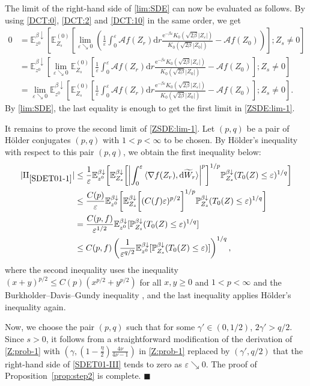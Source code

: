 \documentclass[12pt, twoside]{article}
\numberwithin{figure}{section}
\newcommand{\e}{{\mathrm e}}
\newcommand{\1}{\mathds 1}
\newcommand{\vep}{{\varepsilon}}
\newcommand{\da}{{\downarrow}}
\newcommand{\la}{{\langle}}
\newcommand{\ra}{{\rangle}}
\newcommand{\ms}{\mathscr}
\renewcommand{\P}{{\mathbb P}}
\newcommand{\E}{{\mathbb E}}
\renewcommand{\d}{{\mathrm d}}
\newcommand{\2}{{\mathbf 1}}
\renewenvironment{proof}[1][\proofname]{\noindent {\bfseries #1.}\;}{\hfill\ensuremath{\blacksquare}\\}
\newcommand{\II}{{\rm II}}
\begin{document}
\begin{proof}[Proof of Proposition~\ref{prop:step2}]
The limit of the right-hand side of \eqref{lim:SDE} can now be evaluated as follows. By using  \eqref{DCT:0}, \eqref{DCT:2} and \eqref{DCT:10}  in the same order, we get
\begin{align*}
0&=\E_{z^0}^{\beta\da}\left[\E^{(0)}_{Z_s}\left[\lim_{\vep \searrow 0}\left(\frac{1}{\vep}\int_0^\vep \ms A f(Z_r)\d r\frac{\e^{-\beta\vep}K_0(\sqrt{2\beta}|Z_\vep|)}{K_0(\sqrt{2\beta}|Z_0|)}-\ms Af(Z_0)\right)\right];Z_s\neq 0\right]\\
&=\E_{z^0}^{\beta\da}\left[\lim_{\vep \searrow 0}\E^{(0)}_{Z_s}\left[\frac{1}{\vep}\int_0^\vep \ms A f(Z_r)\d r\frac{\e^{-\beta\vep}K_0(\sqrt{2\beta}|Z_\vep|)}{K_0(\sqrt{2\beta}|Z_0|)}-\ms Af(Z_0)\right];Z_s\neq 0\right]\\
&=\lim_{\vep \searrow 0}\E_{z^0}^{\beta\da}\left[\E^{(0)}_{Z_s}\left[\frac{1}{\vep}\int_0^\vep \ms A f(Z_r)\d r\frac{\e^{-\beta\vep}K_0(\sqrt{2\beta}|Z_\vep|)}{K_0(\sqrt{2\beta}|Z_0|)}-\ms Af(Z_0)\right];Z_s\neq 0\right].
\end{align*}
By \eqref{lim:SDE}, the last equality is enough to get the first limit in \eqref{ZSDE:lim-1}.\smallskip 

It remains to prove the second limit of \eqref{ZSDE:lim-1}. Let $(p,q)$ be a pair of H\"older conjugates $(p,q)$ with $1<p<\infty$ to be chosen. By H\"older's inequality with respect to this pair $(p,q)$, we obtain the first inequality below: 
\begin{align}
|\II_{\ref{SDET01-1}}|&\leq \frac{1}{\vep}\E_{z^0}^{\beta\da}\biggl[\E^{\beta\da}_{Z_s}\biggl[\biggl|\int_0^\vep \la \nabla f(Z_r),\d \widetilde{W}_r\ra \biggr|^p\biggr]^{1/p}\P^{\beta\da}_{Z_s}(T_0(Z)\leq \vep)^{1/q}\biggr]\notag\\
&\leq \frac{C(p)}{\vep}\E_{z^0}^{\beta\da}\biggl[\E^{\beta\da}_{Z_s}\biggl[(C(f)\vep)^{p/2}\biggr]^{1/p}\P^{\beta\da}_{Z_s}(T_0(Z)\leq \vep)^{1/q}\biggr]\notag\\
&=\frac{C(p,f)}{\vep^{1/2}}\E_{z^0}^{\beta\da}[\P^{\beta\da}_{Z_s}(T_0(Z)\leq \vep)^{1/q}]\notag\\
&\leq C(p,f)\left(\frac{1}{\vep^{q/2}}\E_{z^0}^{\beta\da}[\P^{\beta\da}_{Z_s}(T_0(Z)\leq \vep)]\right)^{1/q},\label{SDET01-III}
\end{align}
where the second inequality uses  the inequality $(x+y)^{p/2}\leq C(p)(x^{p/2}+y^{p/2})$ for all $x,y\geq 0$ and $1<p<\infty$
and the Burkholder--Davis--Gundy inequality \cite[(4.1) Theorem, p.160]{RY}, and the last inequality applies H\"older's inequality again. 

Now, we choose the pair $(p,q)$ such that for some $\gamma'\in (0,1/2)$, 
$2\gamma'>q/2$. Since $s>0$, it follows from a straightforward modification of the derivation of \eqref{Z:prob-1} with $(\gamma,(1-\frac{\eta}{2})\frac{4\nu}{4\nu-1})$ in \eqref{Z:prob-1} replaced by $(\gamma',q/2)$
 that the right-hand side of \eqref{SDET01-III} tends to zero as $\vep \searrow 0$. The proof of Proposition~\ref{prop:step2} is complete.
\end{proof}
\end{document}
